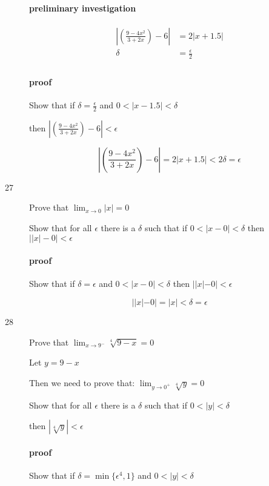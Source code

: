 \documentclass[letterpaper, landscape]{exam}
\begin{document}
\begin{description}
        \paragraph{preliminary investigation}
        \begin{align*}
          \left| \left( \frac{9 - 4x^2}{3 + 2x} \right) - 6 \right| & = 2 |x + 1.5| \\
          \delta                                                    & = \frac{\epsilon}{2} \\
        \end{align*}

        \paragraph{proof}
        Show that if $\delta = \frac{\epsilon}{2}$ and $0 < |x - 1.5| < \delta$

        then $\left| \left( \frac{9 - 4x^2}{3 + 2x} \right) - 6 \right| < \epsilon$

        \[
          \left| \left( \frac{9 - 4x^2}{3 + 2x} \right) - 6 \right| = 2 |x + 1.5| < 2 \delta = \epsilon
        \]

      \item[27] Prove that $\lim_{x \to 0} |x| = 0$

        Show that for all $\epsilon$ there is a $\delta$ such that if 
        $0 < |x - 0| < \delta$ then $ \left| |x| - 0 \right| < \epsilon$

        \paragraph{proof}
        Show that if $\delta = \epsilon$ and $0 < |x - 0| < \delta$
        then $| |x| - 0| < \epsilon$

        \[
          | |x| - 0| = |x| < \delta = \epsilon
        \]

      \item[28] Prove that $\lim_{x \to 9^-} \sqrt[4]{9 - x} = 0$

        Let $y = 9 - x$

        Then we need to prove that: $\lim_{y \to 0^+} \sqrt[4]{y} = 0$

        Show that for all $\epsilon$ there is a $\delta$ such that if 
        $0 < |y| < \delta$ 
        
        then $ \left| \sqrt[4]{y} \right| < \epsilon$

        \paragraph{proof}
        Show that if $\delta = \min \{ \epsilon^4, 1 \}$ and 
        $0 < |y| < \delta$ 
        

\end{description}
\end{document}
